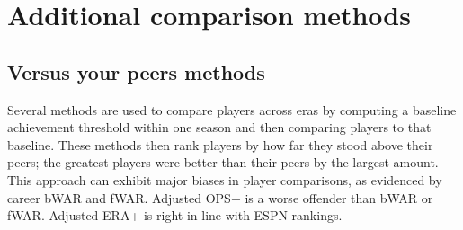 \documentclass[11pt]{article}\usepackage[]{graphicx}\usepackage[]{color}
\begin{document}
\section{Additional comparison methods}




\subsection{Versus your peers methods}
\label{WARcritique}

Several methods are used to compare players across eras by computing a 
baseline achievement threshold within one season and then comparing players 
to that baseline. These methods then rank players by how far they stood 
above their peers; the greatest players were better than their peers by 
the largest amount. 
This approach can exhibit major biases in player comparisons, as evidenced by 
career bWAR and fWAR.   Adjusted OPS+ is a worse offender 
than bWAR or fWAR.  Adjusted ERA+ is right in line with ESPN rankings.
\end{document}
